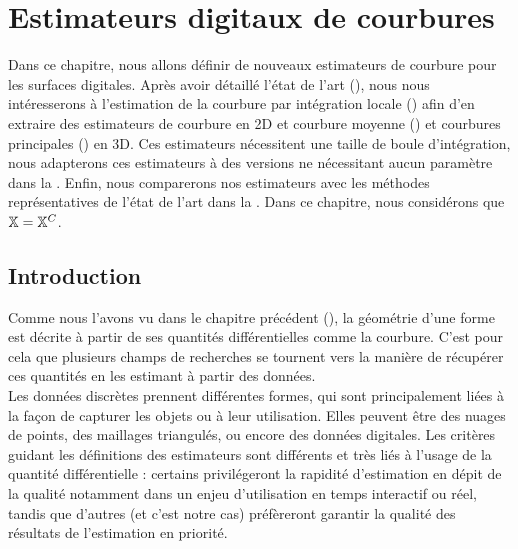 %
\chapter{Estimateurs digitaux de courbures}
\label{sec:estimators}
%
%
\setcounter{minitocdepth}{4}
\minitoc
%
\newpage
%
Dans ce chapitre, nous allons définir de nouveaux estimateurs de courbure pour
les surfaces digitales. Après avoir détaillé l'état de l'art
(), nous nous intéresserons à l'estimation de la
courbure par intégration locale () afin d'en
extraire des estimateurs de courbure en 2D et courbure moyenne
() et courbures principales
() en 3D. Ces estimateurs nécessitent une taille de boule
d'intégration, nous adapterons ces estimateurs à des versions ne nécessitant
aucun paramètre dans la . Enfin, nous
comparerons nos estimateurs avec les méthodes représentatives de l'état de l'art
dans la . Dans ce chapitre, nous
considérons que $\mathbb{X} = \mathbb{X}^{C}$.
%
\section{Introduction}
\label{sec:estimators:introduction}
%
Comme nous l'avons vu dans le chapitre précédent (),
la géométrie d'une forme est décrite à partir de ses quantités différentielles comme la
courbure.
C'est pour cela que plusieurs champs de
recherches se tournent vers la manière de récupérer ces quantités en les
estimant à partir des données.
%
\\
%
Les données discrètes prennent différentes formes, qui sont principalement liées à la façon de capturer les
objets ou à leur utilisation. Elles peuvent être des nuages de points, des
maillages triangulés, ou encore des données digitales. Les critères guidant les définitions des
estimateurs sont différents et très liés à l'usage de la quantité différentielle :
certains privilégeront la rapidité d'estimation en dépit de la qualité notamment
dans un enjeu d'utilisation en temps interactif ou réel, tandis que d'autres (et
c'est notre cas) préfèreront garantir la qualité des résultats de l'estimation
en priorité.


